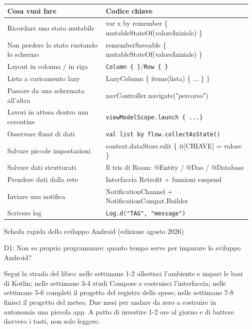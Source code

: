 


\begin{center}
\begin{tabularx}{\linewidth}{|X|X|}
\hline
\textbf{Cosa vuoi fare} & \textbf{Codice chiave} \tabularnewline
\hline
Ricordare uno stato mutabile & var x by remember \{ mutableStateOf(valoreIniziale) \} \tabularnewline
Non perdere lo stato ruotando lo schermo & rememberSaveable \{ mutableStateOf(valoreIniziale) \} \tabularnewline
Layout in colonna / in riga & \texttt{Column \{ \}}/\texttt{Row \{ \}} \tabularnewline
Lista a caricamento lazy & LazyColumn \{ items(lista) \{ ... \} \} \tabularnewline
Passare da una schermata all'altra & navController.navigate("percorso") \tabularnewline
Lavori in attesa dentro una coroutine & \texttt{viewModelScope.\allowbreak launch \{ .\allowbreak .\allowbreak .\allowbreak  \}} \tabularnewline
Osservare flussi di dati & \texttt{val list by flow.\allowbreak collectAsState()} \tabularnewline
Salvare piccole impostazioni & context.dataStore.edit \{ it[CHIAVE] = valore \} \tabularnewline
Salvare dati strutturati & Il tris di Room: @Entity / @Dao / @Database \tabularnewline
Prendere dati dalla rete & Interfaccia Retrofit + funzioni suspend \tabularnewline
Inviare una notifica & NotificationChannel + NotificationCompat.Builder \tabularnewline
Scrivere log & \texttt{Log.\allowbreak d("TAG", "message")} \tabularnewline
\hline
\end{tabularx}
\end{center}

\begin{center}\small\color{gray}Scheda rapida dello sviluppo Android (edizione agosto 2026)\end{center}


D1: Non so proprio programmare: quanto tempo serve per imparare lo sviluppo Android?

Segui la strada del libro: nelle settimane 1-2 allestisci l'ambiente e impari le basi di Kotlin; nelle settimane 3-4 studi Compose e costruisci l'interfaccia; nelle settimane 5-6 completi il progetto del registro delle spese; nelle settimane 7-8 finisci il progetto del meteo. Due mesi per andare da zero a costruire in autonomia una piccola app. A patto di investire 1-2 ore al giorno e di battere davvero i tasti, non solo leggere.

